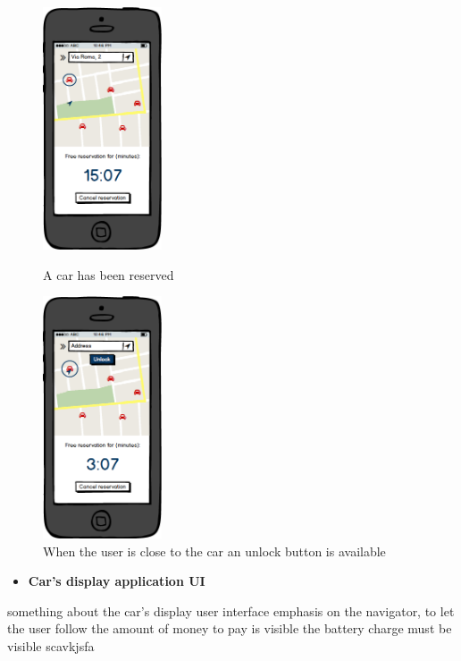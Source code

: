 \documentclass[english]{article}
\begin{document}
\begin{itemize}
\begin{figure}[H]
	\centering
	\begin{minipage}{.55\textwidth}
	\centering
	\includegraphics[width=100pt]{mobile/FreeReservation.png}
	\caption{A car has been reserved}
	\end{minipage}%
	\begin{minipage}{.5\textwidth}
	\centering
	\includegraphics[width=100pt]{mobile/Unlock.png}
	\caption{When the user is close to the car an unlock button is available}
	\end{minipage}
\end{figure}


\newpage
\begin{itemize}
	\item{\textbf{Car's display application UI}}
\end{itemize}

something about the car's display user interface
emphasis on the navigator, to let the user follow
the amount of money to pay is visible
the battery charge must be visible
scavkjsfa


\end{itemize}
\end{document}
